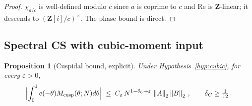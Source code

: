 \documentclass[11pt]{article}
\newtheorem{proposition}[theorem]{Proposition}
\theoremstyle{definition}
\newcommand{\Z}{\mathbf{Z}}
\newcommand{\Zi}{\Z[i]}
\renewcommand{\Re}{\mathrm{Re}}
\newcommand{\norm}[1]{\left\lVert #1\right\rVert}
\begin{document}
\begin{proof}
$\chi_{a/c}$ is well-defined modulo $c$ since $a$ is coprime to $c$ and $\Re$ is $\Z$-linear; it descends to $(\Zi/c)^\times$. The phase bound is direct.
\end{proof}

\subsection{Spectral CS with cubic-moment input}\label{ssec:CS-cubic}

\begin{proposition}[Cuspidal bound, explicit]\label{prop:cuspidal-explicit}
Under Hypothesis~\ref{hyp:cubic}, for every $\varepsilon>0$,
\[
   \Bigl|\int_0^1 e(-\theta)M_{\mathrm{cusp}}(\theta;N)d\theta\Bigr|\;\le\;C_\varepsilon\,N^{1-\delta_C+\varepsilon}\,\norm A_2\norm B_2\,,\qquad\delta_C\ge\tfrac{1}{12}\,.
\]
\end{proposition}
\end{document}
